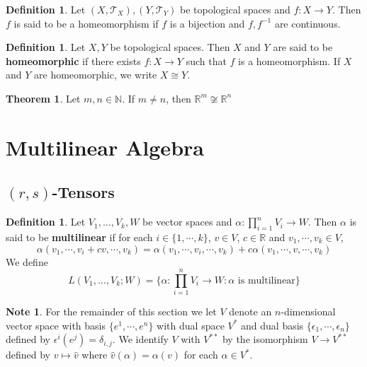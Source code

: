 \documentclass[12pt]{amsart}
\theoremstyle{definition}
\newtheorem{defn}[definition]{Definition}
\newtheorem{note}[definition]{Note}
\newtheorem{thm}[definition]{Theorem}
\newcommand{\al}{\alpha}
\newcommand{\del}{\delta}
\newcommand{\ep}{\epsilon}
\newcommand{\N}{\mathbb{N}}
\newcommand{\R}{\mathbb{R}}
\newcommand{\MT}{\mathcal{T}}
\begin{document}
\begin{defn}
Let $(X, \MT_X), (Y, \MT_Y)$ be topological spaces and $f:X\rightarrow Y$. Then $f$ is said to be a homeomorphism if $f$ is a bijection and $f, f^{-1}$ are continuous. 
\end{defn}

\begin{defn}
Let $X, Y$ be topological spaces. Then $X$ and $Y$ are said to be \textbf{homeomorphic} if there exists $f:X \rightarrow Y$ such that $f$ is a homeomorphism. If $X$ and $Y$ are homeomorphic, we write $X \cong Y$. 
\end{defn}

\begin{thm}
Let $m,n \in \N$. If $m \neq n$, then $\R^m \not \cong \R^n$
\end{thm}






















\newpage
	\section{Multilinear Algebra}
	
	\subsection{$(r,s)$-Tensors}
	
	\begin{defn}
	Let $V_1, \dots, V_k, W$ be vector spaces and $\al : \prod_{i=1}^n V_i \rightarrow W$. Then $\al$ is said to be \textbf{multilinear} if for each $i \in \{1, \cdots, k\}$, $v \in V$, $c \in \R$ and $v_1, \cdots, v_k \in V$, $$\al(v_1, \cdots, v_i + cv, \cdots, v_k) = \al(v_1, \cdots, v_i, \cdots, v_k) + c\al(v_1, \cdots, v, \cdots, v_k)$$
	We define $$L(V_1, \dots, V_k; W) = \bigg \{\al : \prod_{i=1}^n V_i \rightarrow W: \al \text{ is multilinear} \bigg\}$$ 
	\end{defn}	
	
	\begin{note}
		For the remainder of this section we let $V$ denote an $n$-dimensional vector space with basis $\{e^1, \cdots, e^n\}$ with dual space $V^*$ and dual basis $\{\ep_1, \cdots, \ep_n\}$ defined by $\ep^i(e^j) = \del_{i,j}$. We identify $V$ with $V^{**}$ by the isomorphism $V \rightarrow V^{**}$ defined by $v \mapsto \hat{v}$ where $\hat{v}(\al) = \al(v)$ for each $\al \in V^*$. 
	\end{note}	
	
\end{document}
